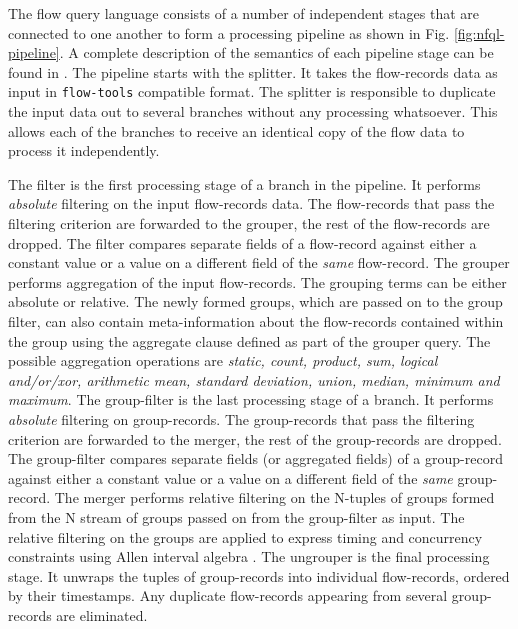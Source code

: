 The flow query language consists of a number of independent stages that are
connected to one another to form a processing pipeline as shown in Fig.
\ref{fig:nfql-pipeline}. A complete description of the semantics of each
pipeline stage can be found in \cite{vmarinov:2009}. The pipeline starts with
the splitter. It takes the flow-records data as input in \texttt{flow-tools}
compatible format. The splitter is responsible to duplicate the input data out
to several branches without any processing whatsoever. This allows each of the
branches to receive an identical copy of the flow data to process it
independently.

The filter is the first processing stage of a branch in the pipeline.  It
performs \emph{absolute} filtering on the input flow-records data.  The
flow-records that pass the filtering criterion are forwarded to the grouper,
the rest of the flow-records are dropped. The filter compares separate fields
of a flow-record against either a constant value or a value on a different
field of the \emph{same} flow-record. The grouper performs aggregation of the
input flow-records. The grouping terms can be either absolute or relative. The
newly formed groups, which are passed on to the group filter, can also contain
meta-information about the flow-records contained within the group using the
aggregate clause defined as part of the grouper query. The possible
aggregation operations are \emph{static, count, product, sum, logical
and/or/xor, arithmetic mean, standard deviation, union, median, minimum and
maximum}. The group-filter is the last processing stage of a branch. It
performs \emph{absolute} filtering on group-records. The group-records that
pass the filtering criterion are forwarded to the merger, the rest of the
group-records are dropped. The group-filter compares separate fields (or
aggregated fields) of a group-record against either a constant value or a
value on a different field of the \emph{same} group-record. The merger
performs relative filtering on the N-tuples of groups formed from the N stream
of groups passed on from the group-filter as input. The relative filtering on
the groups are applied to express timing and concurrency constraints using
Allen interval algebra \cite{fallen:1983}. The ungrouper is the final
processing stage. It unwraps the tuples of group-records into individual
flow-records, ordered by their timestamps. Any duplicate flow-records
appearing from several group-records are eliminated.
